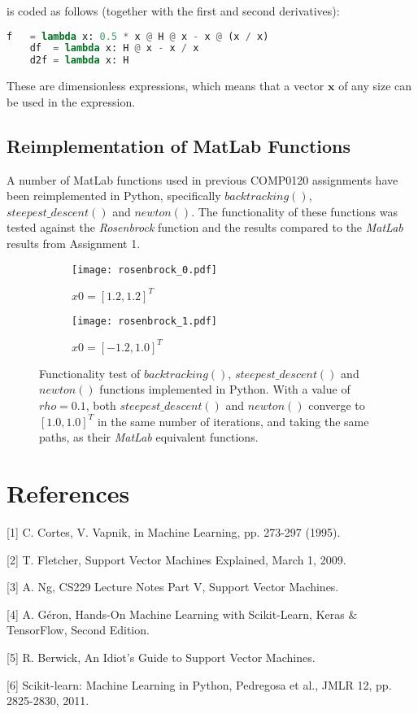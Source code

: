 \documentclass[10pt, a4paper,reqno]{amsart}
\begin{document}
is coded as follows (together with the first and second derivatives):

\begin{lstlisting}[language=Python]
    f   = lambda x: 0.5 * x @ H @ x - x @ (x / x)
    df  = lambda x: H @ x - x / x
    d2f = lambda x: H 
\end{lstlisting}

These are dimensionless expressions, which means that a vector $\mathbf{x}$ of any size can be used in the expression.

\subsection{Reimplementation of MatLab Functions}

A number of MatLab functions used in previous COMP0120 assignments have been reimplemented in Python, specifically $backtracking()$, $steepest\_descent()$ and $newton()$. The functionality of these functions was tested against the \emph{Rosenbrock} function and the results compared to the \emph{MatLab} results from Assignment 1.

\begin{figure}[H]
	\centering	
	\begin{subfigure}{1.0\textwidth}
		\centering
		\texttt{[image: rosenbrock\_0.pdf]}
		\caption{$x0 = [1.2, 1.2]^T$}
	\end{subfigure}
	\begin{subfigure}{1.0\textwidth}
		\centering
		\texttt{[image: rosenbrock\_1.pdf]}
		\caption{$x0 = [-1.2, 1.0]^T$}
	\end{subfigure}
	\caption{Functionality test of $backtracking()$, $steepest\_descent()$ and $newton()$ functions implemented in Python. With a value of $rho = 0.1$, both $steepest\_descent()$ and $newton()$ converge to $[1.0, 1.0]^T$ in the same number of iterations, and taking the same paths, as their \emph{MatLab} equivalent functions.}
\end{figure}


%
%
\clearpage\section{References}

[1] C. Cortes, V. Vapnik, in Machine Learning, pp. 273-297 (1995).

[2] T. Fletcher, Support Vector Machines Explained, March 1, 2009.

[3] A. Ng, CS229 Lecture Notes Part V, Support Vector Machines.

[4] A. G\'{e}ron, Hands-On Machine Learning with Scikit-Learn, Keras \& TensorFlow, Second Edition.

[5] R. Berwick, An Idiot's Guide to Support Vector Machines.

[6] Scikit-learn: Machine Learning in Python, Pedregosa et al., JMLR 12, pp. 2825-2830, 2011.
\end{document}
